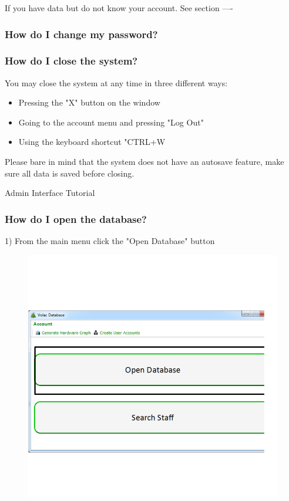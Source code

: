 If you have data but do not know your account. See section ----

\subsubsection{How do I change my password?}


\subsubsection{How do I close the system?}

You may close the system at any time in three different ways:

\begin{itemize}
\item{Pressing the "X" button on the window}
\item{Going to the account menu and pressing "Log Out"}
\item{Using the keyboard shortcut "CTRL+W}
\end{itemize}

Please bare in mind that the system does not have an autosave feature, make sure all data is saved before closing.

Admin Interface Tutorial

\subsubsection{How do I open the database?}\label{opendb}

1) From the main menu click the "Open Database" button

\begin{figure}[H]
    \includegraphics[width=\textwidth]{./Manual/Images/opendb1.png}
\end{figure}


